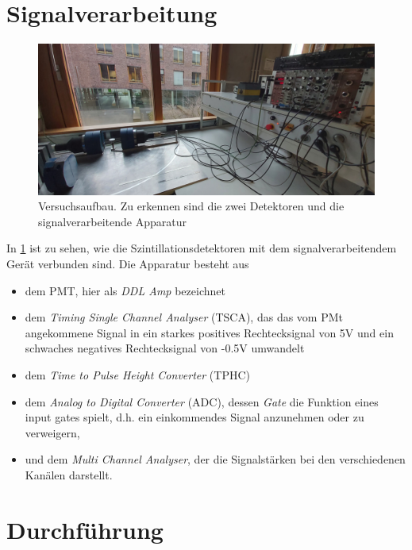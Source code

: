 \documentclass[%
aps,
onecolumn,
11pt,
tightenlines,
nofootinbib,
superscriptaddress,
floatfix,
prd,
]{revtex4-2}
\begin{document}
\section{Signalverarbeitung}
\label{sec:Signalverarbeitung}
\begin{figure}[ht]
	\includegraphics[scale=0.14]{images/setting.jpg}
	\caption{Versuchsaufbau. Zu erkennen sind die zwei Detektoren und die signalverarbeitende Apparatur}
	\label{fig:setting}
\end{figure}
In \ref{fig:setting} ist zu sehen, wie die Szintillationsdetektoren mit dem signalverarbeitendem Gerät verbunden sind. Die Apparatur besteht aus
\begin{itemize}
	\item dem PMT, hier als \textit{DDL Amp} bezeichnet
	\item dem \textit{Timing Single Channel Analyser} (TSCA), das das vom PMt angekommene Signal in ein starkes positives Rechtecksignal von 5V und ein schwaches negatives Rechtecksignal von -0.5V umwandelt
	\item dem \textit{Time to Pulse Height Converter} (TPHC)
	\item dem \textit{Analog to Digital Converter} (ADC), dessen \textit{Gate} die Funktion eines input gates spielt, d.h. ein einkommendes Signal anzunehmen oder zu verweigern,
	\item und dem \textit{Multi Channel Analyser}, der die Signalstärken bei den verschiedenen Kanälen darstellt.
\end{itemize}
\newpage
\section{Durchführung}
\label{sec:Durchführung und Resultate}
\end{document}

